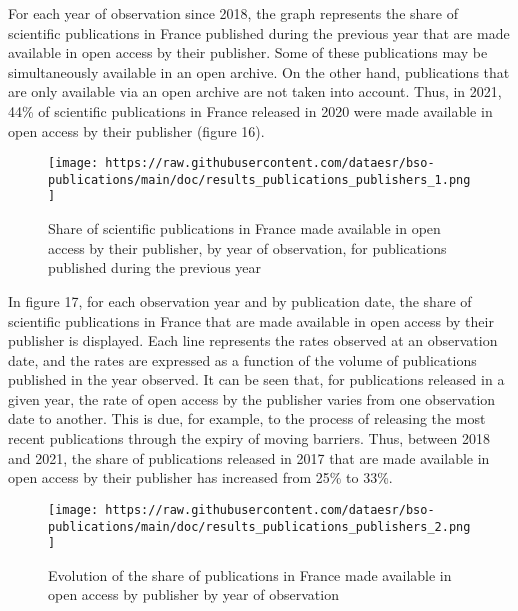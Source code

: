 \documentclass[
]{article}
\begin{document}
For each year of observation since 2018, the graph represents the share
of scientific publications in France published during the previous year
that are made available in open access by their publisher. Some of these
publications may be simultaneously available in an open archive. On the
other hand, publications that are only available via an open archive are
not taken into account. Thus, in 2021, 44\% of scientific publications
in France released in 2020 were made available in open access by their
publisher (figure 16).

\begin{figure}
\centering
\texttt{[image: https://raw.githubusercontent.com/dataesr/bso-publications/main/doc/results\_publications\_publishers\_1.png]}
\caption{Share of scientific publications in France made available in
open access by their publisher, by year of observation, for publications
published during the previous year}
\end{figure}

In figure 17, for each observation year and by publication date, the
share of scientific publications in France that are made available in
open access by their publisher is displayed. Each line represents the
rates observed at an observation date, and the rates are expressed as a
function of the volume of publications published in the year observed.
It can be seen that, for publications released in a given year, the rate
of open access by the publisher varies from one observation date to
another. This is due, for example, to the process of releasing the most
recent publications through the expiry of moving barriers. Thus, between
2018 and 2021, the share of publications released in 2017 that are made
available in open access by their publisher has increased from 25\% to
33\%.

\begin{figure}
\centering
\texttt{[image: https://raw.githubusercontent.com/dataesr/bso-publications/main/doc/results\_publications\_publishers\_2.png]}
\caption{Evolution of the share of publications in France made available
in open access by publisher by year of observation}
\end{figure}
\end{document}
